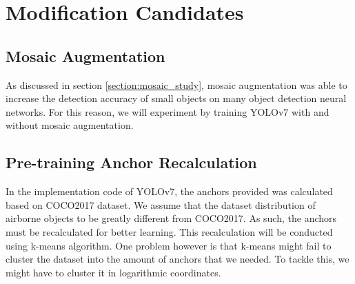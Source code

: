 \section{Modification Candidates}
\label{section:modificationcandidates}
  \subsection{Mosaic Augmentation}
  As discussed in section \ref{section:mosaic_study}, mosaic augmentation was able to increase the detection accuracy of small objects
  on many object detection neural networks. For this reason, we will experiment by training YOLOv7 with and without  mosaic augmentation.
  \subsection{Pre-training Anchor Recalculation}

  In the implementation code of YOLOv7, the anchors provided was calculated based on COCO2017 dataset.
  We assume that the dataset distribution of airborne objects to be greatly different from COCO2017.
  As such, the anchors must be recalculated for better learning. This recalculation will be conducted
  using k-means algorithm. One problem however is that k-means might fail to cluster the dataset into 
  the amount of anchors that we needed. To tackle this, we might have to cluster it in logarithmic coordinates. 

